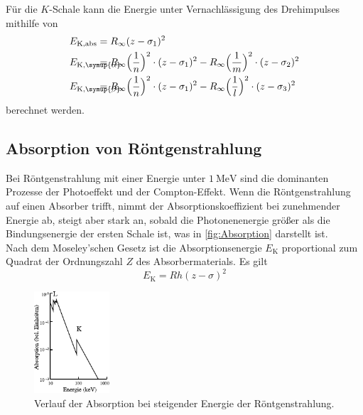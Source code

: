     Für die $K$-Schale kann die Energie unter Vernachlässigung des Drehimpulses mithilfe von
    \begin{align}
        \nonumber
        E_\text{K,abs} &= R_\infty (z - \sigma_1)^2
        \\
        \label{eqn:EnergieKalpha}
        E_{\mathmakebox[0pt][l]{\text{K},\symup{\alpha}}\phantom{\text{K,abs}}} &= R_\infty \Bigl(\frac{1}{n}\Bigr)^2 \cdot (z - \sigma_1)^2 -R_\infty \Bigl(\frac{1}{m}\Bigr)^2 \cdot (z - \sigma_2)^2
        \\
        \label{eqn:EnergieKbeta}
        E_{\mathmakebox[0pt][l]{\text{K},\symup{\beta}}\phantom{\text{K,abs}}} &= R_\infty \Bigl(\frac{1}{n}\Bigr)^2 \cdot (z - \sigma_1)^2 - R_\infty \Bigl(\frac{1}{l}\Bigr)^2 \cdot (z - \sigma_3)^2
    \end{align}
    berechnet werden.\\


\subsection{Absorption von Röntgenstrahlung}

    Bei Röntgenstrahlung mit einer Energie unter $\SI{1}{\mega\electronvolt}$ sind die dominanten Prozesse der Photoeffekt und der Compton-Effekt.
    Wenn die Röntgenstrahlung auf einen Absorber trifft,
    nimmt der Absorptionskoeffizient bei zunehmender Energie ab,
    steigt aber stark an,
    sobald die Photonenenergie größer als die Bindungsenergie der ersten Schale ist,
    was in \autoref{fig:Absorption} darstellt ist.\\
    Nach dem Moseley'schen Gesetz ist die Absorptionsenergie $E_\text{K}$ proportional zum Quadrat der Ordnungszahl $Z$ des Absorbermaterials.
    Es gilt
    \begin{equation}
        E_\text{K} = R h (z - \sigma)^2
        \label{eqn:Moseley}
    \end{equation}

    \begin{figure}
        \centering
        \includegraphics[width=0.25\textwidth]{content/img/Abb_2.pdf}
        \caption{Verlauf der Absorption bei steigender Energie der Röntgenstrahlung. \cite{versuchsanleitung}}
        \label{fig:Absorption}
    \end{figure}


